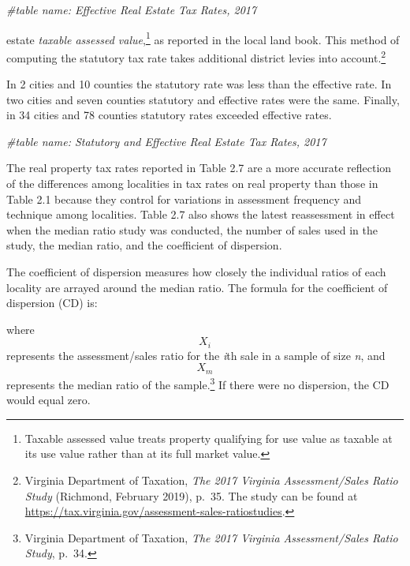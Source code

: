 \documentclass[
]{book}
\newenvironment{Shaded}{\begin{snugshade}}{\end{snugshade}}
\newcommand{\CommentTok}[1]{\textcolor[rgb]{0.56,0.35,0.01}{\textit{#1}}}
\begin{document}
\begin{Shaded}
\begin{Highlighting}[]
\CommentTok{\#table name: Effective Real Estate Tax Rates, 2017}
\end{Highlighting}
\end{Shaded}

estate \emph{taxable assessed value},\footnote{Taxable assessed value treats property qualifying for use value
  as taxable at its use value rather than at its full market value.} as reported in the local land book. This method of computing the statutory tax rate takes additional district levies into account.\footnote{Virginia Department of Taxation, \emph{The 2017 Virginia Assessment/Sales Ratio Study} (Richmond, February 2019), p.~35. The study
  can be found at \url{https://tax.virginia.gov/assessment-sales-ratiostudies}.}

In 2 cities and 10 counties the statutory rate was less than the effective rate. In two cities and seven counties statutory and effective rates were the same. Finally, in 34 cities and 78 counties statutory rates exceeded effective rates.

\begin{Shaded}
\begin{Highlighting}[]
\CommentTok{\#table name: Statutory and Effective Real Estate Tax Rates, 2017}
\end{Highlighting}
\end{Shaded}

The real property tax rates reported in Table 2.7 are a more accurate reflection of the differences among localities in tax rates on real property than those in Table 2.1 because they control for variations in assessment frequency and technique among localities. Table 2.7 also shows the latest reassessment in effect when the median ratio study was conducted, the number of sales used in the study, the median ratio, and the coefficient of dispersion.

The coefficient of dispersion measures how closely the individual ratios of each locality are arrayed around the median ratio. The formula for the coefficient of dispersion (CD) is:

where \[X_i\] represents the assessment/sales ratio for the \emph{i}th sale in a sample of size \emph{n}, and \[X_m\] represents the median ratio of the sample.\footnote{Virginia Department of Taxation, \emph{The 2017 Virginia Assessment/Sales Ratio Study}, p.~34.} If there were no dispersion, the CD would equal zero.
\end{document}
